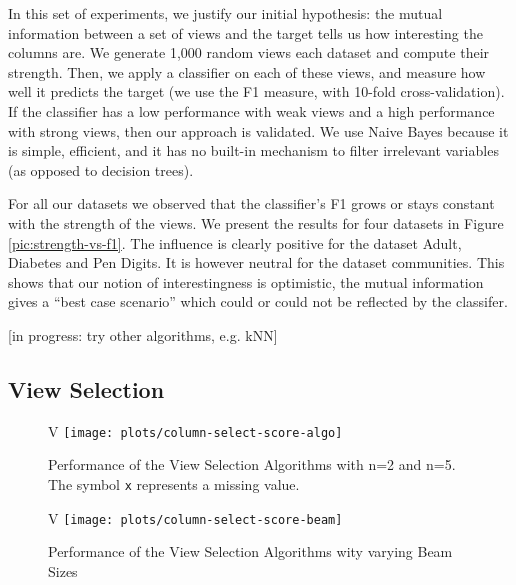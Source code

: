 In this set of experiments, we justify our initial hypothesis: the mutual
information between a set of views and the target tells us how interesting the
columns are. We generate 1,000 random views each dataset and compute their
strength. Then, we apply a classifier on each of these views, and measure how
well it predicts the target (we use the F1 measure, with 10-fold
cross-validation). If the classifier has a low performance with weak views and
a high performance with strong views, then our approach is validated. We use
Naive Bayes because it is simple, efficient, and it has no built-in
mechanism to filter irrelevant variables (as opposed to decision trees).

For all our datasets we observed that the classifier's F1 grows or stays
constant with the strength of the views. We present the results for four
datasets in Figure \ref{pic:strength-vs-f1}. The influence is clearly positive
for the dataset Adult, Diabetes and Pen Digits.  It is however neutral for the
dataset communities. This shows that our notion of interestingness is
optimistic, the mutual information gives a ``best case scenario'' which could
or could not be reflected by the classifer.

[in progress: try other algorithms, e.g. kNN]


\subsection{View Selection}

\begin{figure}[t!]V
\centering
\texttt{[image: plots/column-select-score-algo]}
\caption{Performance of the View Selection Algorithms with n=2 and n=5. The
symbol \texttt{x} represents a missing value.}
\label{pic:column-select-score-algo}
\end{figure}

\begin{figure}[t!]V
\centering
\texttt{[image: plots/column-select-score-beam]}
\caption{Performance of the View Selection Algorithms wity varying Beam Sizes}
\label{pic:column-select-score-beam}
\end{figure}

